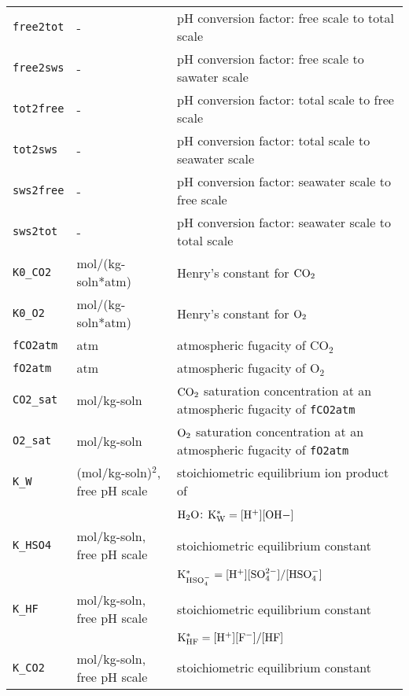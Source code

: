 \documentclass[article,nojss]{jss}
\begin{document}
\begin{footnotesize}
\begin{longtable}{l|l|p{7cm}}
\texttt{free2tot}    & -                            & pH conversion factor: free scale to total scale\\
\texttt{free2sws}    & -                            & pH conversion factor: free scale to sawater scale\\
\texttt{tot2free}    & -                            & pH conversion factor: total scale to free scale\\ 
\texttt{tot2sws}     & -                            & pH conversion factor: total scale to seawater scale\\ 
\texttt{sws2free}    & -                            & pH conversion factor: seawater scale to  free scale\\ 
\texttt{sws2tot}     & -                            & pH conversion factor: seawater scale to total scale\\ 
\texttt{K0\_CO2}     & mol/(kg-soln*atm)            & Henry's constant for $\rm CO_2$\\ 
\texttt{K0\_O2}      & mol/(kg-soln*atm)            & Henry's constant for $\rm O_2$\\ 
\texttt{fCO2atm}     & atm                          & atmospheric fugacity of CO$_2$\\
\texttt{fO2atm}      & atm                          & atmospheric fugacity of O$_2$\\
\texttt{CO2\_sat}    & mol/kg-soln                  & $\rm CO_2$ saturation concentration at an atmospheric fugacity of \texttt{fCO2atm}\\
\texttt{O2\_sat}     & mol/kg-soln                  & $\rm O_2$ saturation concentration at an atmospheric  fugacity of \texttt{fO2atm}\\
\texttt{K\_W}        &(mol/kg-soln)$^2$, free pH scale & stoichiometric equilibrium ion product of \\
            &                              & $\rm H_2O$: $\rm K^*_W = [H^+][OH-]$\\
\texttt{K\_HSO4}     &mol/kg-soln,       free pH scale & stoichiometric equilibrium constant \\
            &                              & $\rm K^*_{HSO_4^-} = [H^+][SO_4^{2-}] / [HSO_4^-]$\\
\texttt{K\_HF}       &mol/kg-soln,       free pH scale & stoichiometric equilibrium constant\\
            &                                 & $\rm K^*_{HF} = [H^+][F^{-}] / [HF]$\\
\texttt{K\_CO2}      &mol/kg-soln,       free pH scale & stoichiometric equilibrium constant\\

\end{longtable}
\end{footnotesize}
\end{document}
